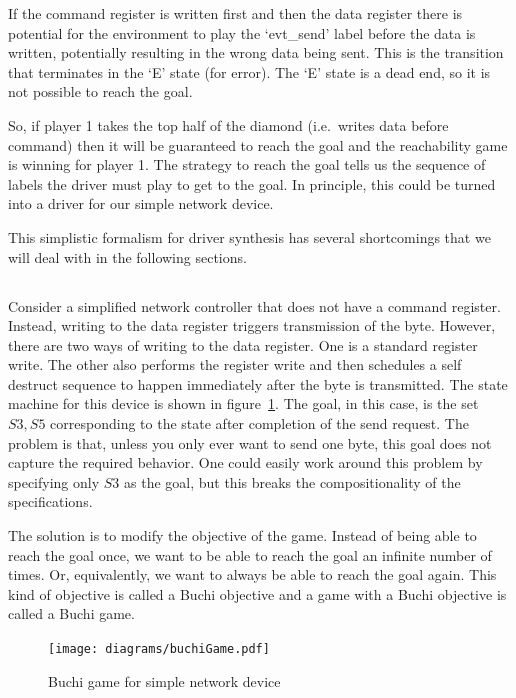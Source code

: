 If the command register is written first and then the data register there is potential for the environment to play the `evt\_send' label before the data is written, potentially resulting in the wrong data being sent. This is the transition that terminates in the `E' state (for error). The `E' state is a dead end, so it is not possible to reach the goal. 

So, if player 1 takes the top half of the diamond (i.e.\ writes data before command) then it will be guaranteed to reach the goal and the reachability game is winning for player 1. The strategy to reach the goal tells us the sequence of labels the driver must play to get to the goal. In principle, this could be turned into a driver for our simple network device.

This simplistic formalism for driver synthesis has several shortcomings that we will deal with in the following sections.

\subsection{\buchi}

Consider a simplified network controller that does not have a command register. Instead, writing to the data register triggers transmission of the byte. However, there are two ways of writing to the data register. One is a standard register write. The other also performs the register write and then schedules a self destruct sequence to happen immediately after the byte is transmitted. The state machine for this device is shown in figure~\ref{fig:buchi}. The goal, in this case, is the set ${S3, S5}$ corresponding to the state after completion of the send request. The problem is that, unless you only ever want to send one byte, this goal does not capture the required behavior. One could easily work around this problem by specifying only ${S3}$ as the goal, but this breaks the compositionality of the specifications.

The solution is to modify the objective of the game. Instead of being able to reach the goal once, we want to be able to reach the goal an infinite number of times. Or, equivalently, we want to always be able to reach the goal again. This kind of objective is called a Buchi objective and a game with a Buchi objective is called a Buchi game. 

\begin{figure}
\centering
\texttt{[image: diagrams/buchiGame.pdf]}
\caption{Buchi game for simple network device}
\label{fig:buchi}
\end{figure}

